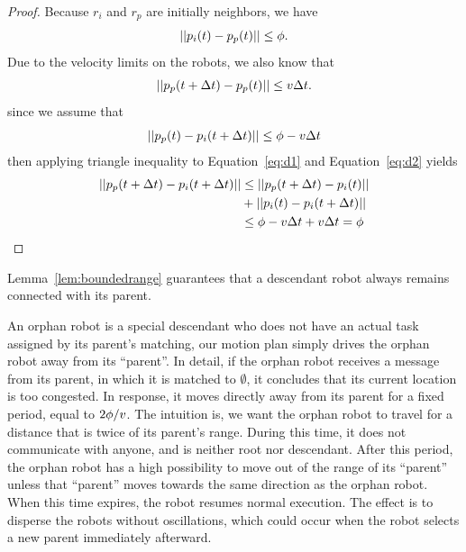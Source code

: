 \begin{proof}
Because $r_i$ and $r_p$ are initially neighbors, we have
  \begin{equation}
    || p_i(t) - p_p(t) || \leq \phi.
  \end{equation}
Due to the velocity limits on the robots, we also know that
  \begin{equation}\label{eq:d1}
    || p_p(t+\Delta t)- p_p(t) ||\leq v\Delta t.
  \end{equation}
since we assume that 
  \begin{equation}\label{eq:d2}
    || p_p(t) - p_i(t+\Delta t) || \leq \phi - v\Delta t
  \end{equation}
then applying triangle inequality to Equation~\ref{eq:d1} and Equation~\ref{eq:d2} yields
  \begin{eqnarray*}
  \label{eq:d3}
    || p_p(t+\Delta t) - p_i(t+\Delta t) || & \leq || p_p(t+\Delta t) - p_i(t)|| \\
      & + || p_i(t) - p_i(t+\Delta t)|| \\
      & \leq \phi - v\Delta t + v\Delta t = \phi
  \end{eqnarray*}
\end{proof}
\begin{figure}
    \centering
    
    \label{fig:boundedrange}
\end{figure}

Lemma~\ref{lem:boundedrange} guarantees that a descendant robot always remains connected with its parent. 

An orphan robot is a special descendant who does not have an actual task assigned by its parent's matching, our motion plan simply drives the orphan robot away from its ``parent''. 
%
In detail, if the orphan robot receives a message from its parent, in which it is matched to $\emptyset$, it concludes that its current location is too congested.
%
In response, it moves directly away from its parent for a fixed period, equal to $2\phi/v$.
%
The intuition is, we want the orphan robot to travel for a distance that is twice of its parent's range.
%
During this time, it does not communicate with anyone, and is neither root nor descendant. 
%
After this period, the orphan robot has a high possibility to move out of the range of its ``parent'' unless that ``parent'' moves towards the same direction as the orphan robot.
%
When this time expires, the robot resumes normal execution. 
%
The effect is to disperse the robots without oscillations, which could occur when the robot selects a new parent immediately afterward.


